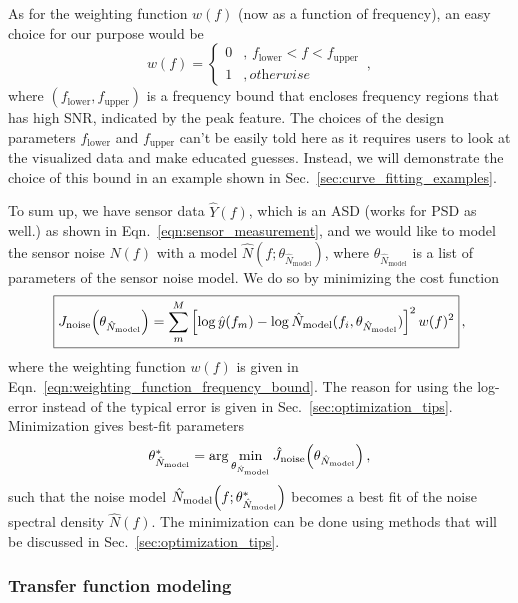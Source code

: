 As for the weighting function $w(f)$ (now as a function of frequency), an easy choice for our purpose would be
\begin{equation}
	w(f)=
	\begin{cases}
		0 &,\, f_\mathrm{lower}<f<f_\mathrm{upper} \\
		1 &,\, \textit{otherwise}
	\end{cases}
	\,,
	\label{eqn:weighting_function_frequency_bound}
\end{equation}
where $\left(f_\mathrm{lower},f_\mathrm{upper}\right)$ is a frequency bound that encloses frequency regions that has high SNR, indicated by the peak feature.
The choices of the design parameters $f_\mathrm{lower}$ and $f_\mathrm{upper}$ can't be easily told here as it requires users to look at the visualized data and make educated guesses.
Instead, we will demonstrate the choice of this bound in an example shown in Sec.~\ref{sec:curve_fitting_examples}.

To sum up, we have sensor data $\hat{Y}(f)$, which is an ASD (works for PSD as well.) as shown in Eqn.~\eqref{eqn:sensor_measurement}, and we would like to model the sensor noise $\hat{N}(f)$ with a model $\hat{N}(f;\theta_{\hat{N}_\mathrm{model}})$, where $\theta_{\hat{N}_\mathrm{model}}$ is a list of parameters of the sensor noise model.
We do so by minimizing the cost function
\begin{equation}
	\boxed{
		J_\mathrm{noise}\mleft(\theta_{\hat{N}_\mathrm{model}}\mright)=\sum_m^M\left[\log\hat{y}(f_m)-\log\hat{N}_\mathrm{model}(f_i, \theta_{\hat{N}_\mathrm{model}})\right]^2 w(f)^2
	}\,,
\end{equation}
where the weighting function $w(f)$ is given in Eqn.~\eqref{eqn:weighting_function_frequency_bound}.
The reason for using the log-error instead of the typical error is given in Sec.~\ref{sec:optimization_tips}.
Minimization gives best-fit parameters
\begin{equation}
	\theta_{\hat{N}_\mathrm{model}}^*=\arg\min_{\theta_{\hat{N}_\mathrm{model}}} \hat{J}_\mathrm{noise}\mleft(\theta_{\hat{N}_\mathrm{model}}\mright)\,,
\end{equation} such that the noise model $\hat{N}_\mathrm{model}\mleft(f;\theta_{\hat{N}_\mathrm{model}}^*\mright)$ becomes a best fit of the noise spectral density $\hat{N}(f)$.
The minimization can be done using methods that will be discussed in Sec.~\ref{sec:optimization_tips}.
\subsubsection{Transfer function modeling \label{sec:transfer_function_modeling}}


